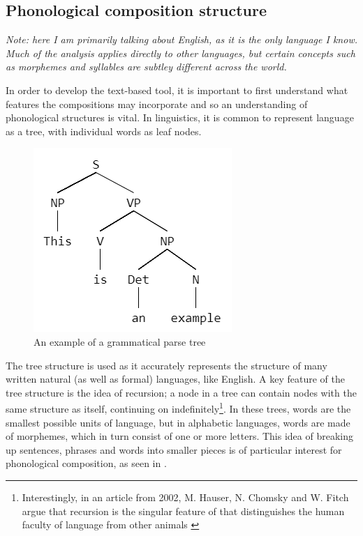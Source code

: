 \documentclass[12pt,a4paper,oneside,openright]{report}
\begin{document}
\subsection{Phonological composition structure}\label{sec:phonology}
\textit{Note: here I am primarily talking about English, as it is the only language I know. Much of the analysis applies directly to other languages, but certain concepts such as morphemes and syllables are subtley different across the world.}

In order to develop the text-based tool, it is important to first understand what features the compositions may incorporate and so an understanding of phonological structures is vital. In linguistics, it is common to represent language as a tree, with individual words as leaf nodes. 
\begin{figure}[h]
    \centering
    \includegraphics[scale=0.5]{images/parse_tree.png}
    \caption{An example of a grammatical parse tree}
    \label{fig:parse_tree}
\end{figure}

The tree structure is used as it accurately represents the structure of many written natural (as well as formal) languages, like English. A key feature of the tree structure is the idea of recursion; a node in a tree can contain nodes with the same structure as itself, continuing on indefinitely\footnote{Interestingly, in an article from 2002, M. Hauser, N. Chomsky and W. Fitch argue that recursion is the singular feature of that distinguishes the human faculty of language from other animals \cite{Hauser02}}. In these trees, words are the smallest possible units of language, but in alphabetic languages, words are made of morphemes, which in turn consist of one or more letters. This idea of breaking up sentences, phrases and words into smaller pieces is of particular interest for phonological composition, as seen in .
\end{document}
